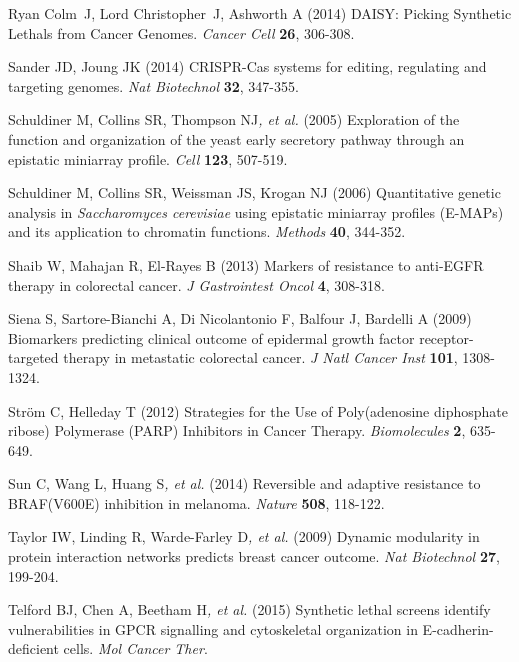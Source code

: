 \hypertarget{ENREF85}{}Ryan Colm~J, Lord Christopher~J, Ashworth A
(2014) DAISY: Picking Synthetic Lethals from Cancer Genomes.
\textit{Cancer Cell} \textbf{26}, 306-308.



Sander JD, Joung JK (2014) CRISPR-Cas systems for editing, regulating
and targeting genomes. \textit{Nat Biotechnol} \textbf{32}, 347-355.



\hypertarget{ENREF87}{}Schuldiner M, Collins SR, Thompson NJ\textit{, et
al.} (2005) Exploration of the function and organization of the yeast
early secretory pathway through an epistatic miniarray profile.
\textit{Cell} \textbf{123}, 507-519.



Schuldiner M, Collins SR, Weissman JS, Krogan NJ (2006) Quantitative
genetic analysis in\textit{ Saccharomyces cerevisiae }using epistatic
miniarray profiles (E-MAPs) and its application to chromatin functions.
\textit{Methods} \textbf{40}, 344-352.



Shaib W, Mahajan R, El-Rayes B (2013) Markers of resistance to anti-EGFR
therapy in colorectal cancer. \textit{J Gastrointest Oncol} \textbf{4},
308-318.



Siena S, Sartore-Bianchi A, Di Nicolantonio F, Balfour J, Bardelli A
(2009) Biomarkers predicting clinical outcome of epidermal growth
factor receptor-targeted therapy in metastatic colorectal cancer.
\textit{J Natl Cancer Inst} \textbf{101}, 1308-1324.



\hypertarget{ENREF91}{}Str\"om C, Helleday T (2012) Strategies for the
Use of Poly(adenosine diphosphate ribose) Polymerase (PARP) Inhibitors
in Cancer Therapy. \textit{Biomolecules} \textbf{2}, 635-649.



\hypertarget{ENREF92}{}Sun C, Wang L, Huang S\textit{, et al.} (2014)
Reversible and adaptive resistance to BRAF(V600E) inhibition in
melanoma. \textit{Nature} \textbf{508}, 118-122.



Taylor IW, Linding R, Warde-Farley D\textit{, et al.} (2009) Dynamic
modularity in protein interaction networks predicts breast cancer
outcome. \textit{Nat Biotechnol} \textbf{27}, 199-204.



\hypertarget{ENREF94}{}Telford BJ, Chen A, Beetham H\textit{, et al.}
(2015) Synthetic lethal screens identify vulnerabilities in GPCR
signalling and cytoskeletal organization in E-cadherin-deficient cells.
\textit{Mol Cancer Ther}.



